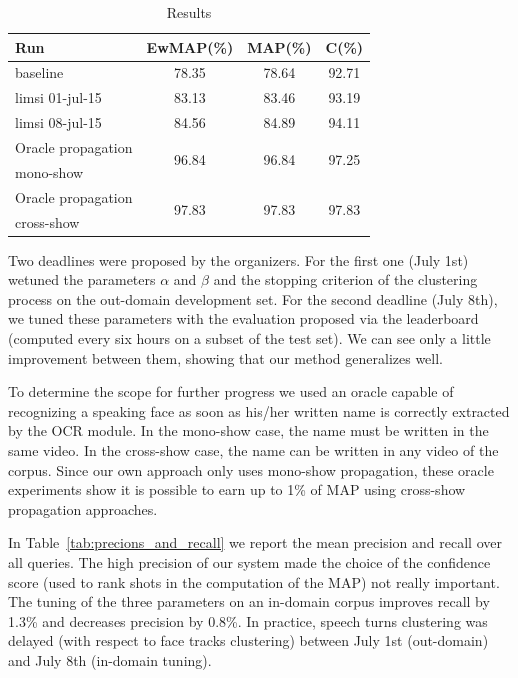 \documentclass{acm_proc_article-me}
\begin{document}
\begin{table}[ht]
  \centering
  \begin{tabular}{|l|c|c|c|}
    \hline
	Run 											& EwMAP(\%)	& MAP(\%)	& C(\%) \\
	\hline
	\hline
	baseline~\cite{POIGNANT--INTERSPEECH--2012}	& 78.35		& 78.64		& 92.71		\\
	\hline
	limsi 01-jul-15 								& 83.13		& 83.46		& 93.19		\\
	limsi 08-jul-15 								& 84.56		& 84.89		& 94.11		\\
	\hline
	\hline
	Oracle propagation 	& \multirow{2}{*}{96.84}		& \multirow{2}{*}{96.84}		& \multirow{2}{*}{97.25}	\\
	mono-show			&							&							&			\\
	\hline
	Oracle propagation 	& \multirow{2}{*}{97.83}		& \multirow{2}{*}{97.83}		& \multirow{2}{*}{97.83}	\\
	cross-show 			&							&							&			\\
  	\hline
  \end{tabular}
  \caption{Results}
  \label{tab:results}
\end{table}

Two deadlines were proposed by the organizers. For the first one (July 1st) wetuned the parameters $\alpha$ and $\beta$ and the stopping criterion of the clustering process on the out-domain development set. For the second deadline (July 8th), we tuned these parameters with the evaluation proposed via the leaderboard (computed every six hours on a subset of the test set). We can see only a little improvement between them, showing that our method generalizes well.

To determine the scope for further progress we used an oracle capable of recognizing a speaking face as soon as his/her written name is correctly extracted by the OCR module. In the mono-show case, the name must be written in the same video. In the cross-show case, the name can be written in any video of the corpus. Since our own approach only uses mono-show propagation, these oracle experiments show it is possible to earn up to 1\% of MAP using cross-show propagation approaches.

In Table~\ref{tab:precions_and_recall} we report the mean precision and recall over all queries. The high precision of our system made the choice of the confidence score (used to rank shots in the computation of the MAP) not really important. The tuning of the three parameters on an in-domain corpus improves recall by 1.3\% and decreases precision by 0.8\%.
In practice, speech turns clustering was delayed (with respect to face tracks clustering) between July 1st (out-domain) and July 8th (in-domain tuning).
\end{document}
